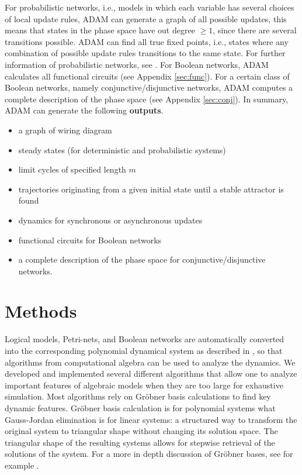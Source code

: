 \documentclass[11pt]{amsart}
\begin{document}
%
%
 
For probabilistic networks, i.e., models in which each variable has several choices of local update rules, ADAM can generate a graph of all possible updates, this means that states in the phase space have out degree $\geq 1$, since there are several transitions possible. ADAM can find all true fixed points, i.e., states where any combination of possible update rules transitions to the same state. For further information of probabilistic networks, see \cite{shmulevich}.
For Boolean networks, ADAM calculates all functional circuits (see Appendix \ref{sec:func}). For a certain class of Boolean networks, namely conjunctive/disjunctive networks, ADAM computes a complete description of the phase space (see Appendix \ref{sec:conj}).
In summary, ADAM can generate the following {\bf outputs}.
\begin{itemize}
\item a graph of wiring diagram
\item steady states (for deterministic and probabilistic systems)
\item limit cycles of specified length $m$
\item trajectories originating from a given initial state until a stable
attractor is found
\item dynamics for synchronous or asynchronous updates
\item functional circuits for Boolean networks
\item a complete description of the phase space for conjunctive/disjunctive
networks.
\end{itemize}
\section{Methods}
Logical models, Petri-nets, and Boolean networks are automatically converted
into the corresponding polynomial dynamical system as described in
\cite{Alan:Bioinf2010}, so that algorithms from computational
algebra can be used to analyze the dynamics.
We developed and implemented several different algorithms that allow one to analyze
important features of algebraic models when they are too large for exhaustive simulation.
Most algorithms rely on Gr\"obner basis calculations to find key dynamic
features. Gr\"obner basis calculation is for polynomial systems what
Gauss-Jordan elimination is for linear systems: a structured way to transform
the original system to triangular shape without changing its solution space.
The triangular shape of the resulting systems allows for stepwise retrieval of the solutions of the system. For a more in depth discussion of Gr\"obner bases, see for example \cite{IVA}.
 
\end{document}
